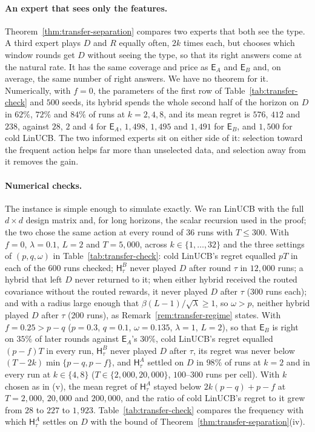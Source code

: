 \documentclass[anon]{alt2027} %
\newcommand{\Exp}{\mathsf{E}}
\newcommand{\Hyb}{\mathsf{H}}
\begin{document}
\paragraph{An expert that sees only the features.}
Theorem~\ref{thm:transfer-separation} compares two experts that both see the
type. A third expert plays $D$ and $R$ equally often, $2k$ times each, but
chooses which window rounds get $D$ without seeing the type, so that its right
answers come at the natural rate. It has the same coverage and price as
$\Exp_A$ and $\Exp_B$ and, on average, the same number of right answers. We
have no theorem for it. Numerically, with $f=0$, the parameters of the first row of
Table~\ref{tab:transfer-check} and $500$ seeds, its hybrid spends the whole
second half of the horizon on $D$ in $62\%$, $72\%$ and $84\%$ of runs at
$k=2,4,8$, and its mean regret is $576$, $412$ and $238$, against $28$, $2$
and $4$ for $\Exp_A$, $1{,}498$, $1{,}495$ and $1{,}491$ for $\Exp_B$, and
$1{,}500$ for cold LinUCB. The two informed experts sit on either side of it:
selection toward the frequent action helps far more than unselected data, and
selection away from it removes the gain.

\paragraph{Numerical checks.}
The instance is simple enough to simulate exactly. We ran LinUCB with the full
$d\times d$ design matrix and, for long horizons, the scalar recursion used in
the proof; the two chose the same action at every round of $36$ runs with
$T\le300$. With $f=0$, $\lambda=0.1$, $L=2$ and $T=5{,}000$, across $k\in\{1,\dots,32\}$
and the three settings of $(p,q,\omega)$ in Table~\ref{tab:transfer-check}: cold
LinUCB's regret equalled $pT$ in each of the $600$ runs checked;
$\Hyb^B_\tau$ never played $D$ after round $\tau$ in $12{,}000$ runs; a hybrid
that left $D$ never returned to it; when either hybrid received the routed
covariance without the routed rewards, it never played $D$ after $\tau$
($300$ runs each); and with a radius large enough that
$\beta(L-1)/\sqrt\lambda\ge1$, so $\omega>p$, neither hybrid played $D$
after $\tau$ ($200$ runs), as Remark~\ref{rem:transfer-regime} states. With
$f=0.25>p-q$ ($p=0.3$, $q=0.1$, $\omega=0.135$, $\lambda=1$, $L=2$), so that
$\Exp_B$ is right on $35\%$ of later rounds against $\Exp_A$'s $30\%$, cold
LinUCB's regret equalled $(p-f)T$ in every run, $\Hyb^B_\tau$ never played $D$
after $\tau$, its regret was never below $(T-2k)\min\{p-q,p-f\}$, and
$\Hyb^A_\tau$ settled on $D$ in $98\%$ of runs at $k=2$ and in every run at
$k\in\{4,8\}$ ($T\in\{2{,}000,20{,}000\}$, $100$--$300$ runs per cell). With $k$
chosen as in (v), the mean regret of $\Hyb^A_\tau$ stayed below
$2k(p-q)+p-f$ at $T=2{,}000$, $20{,}000$ and $200{,}000$, and the ratio of
cold LinUCB's regret to it grew from $28$ to $227$ to $1{,}923$.
Table~\ref{tab:transfer-check} compares the frequency with which
$\Hyb^A_\tau$ settles on $D$ with the bound of
Theorem~\ref{thm:transfer-separation}(iv).
\end{document}
